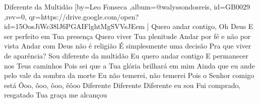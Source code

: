 \beginsong
{Diferente da Multidão %
}[by={Leo Fonseca %
},album={@walyssondosreis},
id={GB0029 %
},rev={0}, %
qr={https://drive.google.com/open?id=15OosJiWc38lJ6PGAIFlghtMgSVVsJEem %
}]
\beginverse*
Quero andar contigo, Oh Deus
E ser perfeito em Tua presença
Quero viver Tua plenitude
Andar por fé e não por vista
\endverse
\beginverse*
Andar com Deus não é religião
É simplesmente uma decisão
Pra que viver de aparência?
Sou diferente da multidão
\endverse
\beginchorus
Eu quero andar contigo
E permanecer nos Teus caminhos
Pois sei que a Tua glória brilhará em mim
Ainda que eu ande pelo vale da sombra da morte
Eu não temerei, não temerei
Pois o Senhor comigo está
Ôoo, ôoo, ôoo, êôoo
\endchorus
\beginverse*
Diferente
Diferente
Diferente eu sou
Fui comprado, resgatado
Tua graça me alcançou
\endverse

